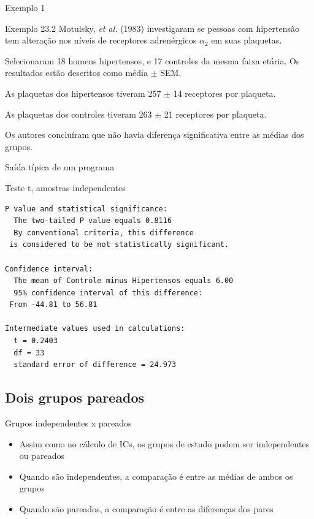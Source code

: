 \documentclass{beamer}
\begin{document}
\begin{frame}{Exemplo 1}
  \begin{exampleblock}{Exemplo 23.2}
    \small
    Motulsky, {\em et al.} (1983) investigaram se pessoas com hipertensão tem alteração nos níveis de receptores adrenérgicos $\alpha_2$ em suas plaquetas.

    \bigskip
    {\footnotesize
      Selecionaram 18 homens hipertensos, e 17 controles da mesma faixa etária.
      Os resultados estão descritos como média $\pm$ SEM.
    }

    \begin{exampleblock}{}
      \footnotesize
      As plaquetas dos hipertensos tiveram 257 $\pm$ 14 receptores por plaqueta.

      As plaquetas dos controles tiveram 263 $\pm$ 21 receptores por plaqueta.
    \end{exampleblock}
    \bigskip
    Os autores concluíram que não havia diferença significativa entre as médias dos grupos.
  \end{exampleblock}
\end{frame}

\begin{frame}[fragile]{Saída típica de um programa}
  \begin{exampleblock}{Teste t, amostras independentes}
    \footnotesize
\begin{verbatim}
P value and statistical significance: 
  The two-tailed P value equals 0.8116 
  By conventional criteria, this difference
 is considered to be not statistically significant. 

Confidence interval: 
  The mean of Controle minus Hipertensos equals 6.00 
  95% confidence interval of this difference:
 From -44.81 to 56.81 

Intermediate values used in calculations: 
  t = 0.2403 
  df = 33 
  standard error of difference = 24.973 
\end{verbatim}
  \end{exampleblock}
\end{frame}


\subsection{Dois grupos pareados}

\begin{frame}{Grupos independentes x pareados}
  \begin{itemize}
  \item Assim como no cálculo de ICs, os grupos de estudo podem ser independentes ou pareados
  \item Quando são independentes, a comparação é entre as médias de ambos os grupos
  \item Quando são pareados, a comparação é entre as diferenças dos pares
  \end{itemize}
\end{frame}
\end{document}

